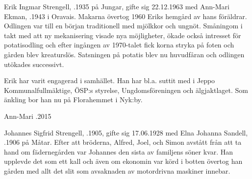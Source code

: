 %
Erik Ingmar Strengell, .1935 på Jungar, gifte sig 22.12.1963 med Ann-Mari Ekman, .1943 i Oravais. Makarna övertog 1960 Eriks hemgård av hans föräldrar. Odlingen var till en början traditionell med mjölkkor och ungnöt. Småningom i takt med att ny mekanisering visade nya möjligheter, ökade också intresset för potatisodling och efter ingången av 1970-talet fick korna stryka på foten och gården blev kreaturslös. Satsningen på potatis blev nu huvudfåran och odlingen utökades successivt.

Erik har varit engagerad i samhället. Han har bl.a. suttit med i Jeppo Kommunalfullmäktige, ÖSP:s styrelse, Ungdomsföreningen och älgjaktlaget. Som änkling bor han nu på Florahemmet i Nyk:by.
\begin{jhchildren}
  \item {}
  \item {}
  \item {}
  \item {}
\end{jhchildren}

Ann-Mari .2015


%
Johannes Sigfrid Strengell, .1905, gifte sig 17.06.1928 med Elna Johanna Sandell, .1906 på Måtar. Efter att bröderna, Alfred, Joel, och Simon avstått från att ta hand om fädernegården var Johannes den sista av familjens söner kvar. Han upplevde det som ett kall och även om ekonomin var körd i botten övertog han gården med allt det slit som avsaknaden av motordrivna maskiner innebar.

